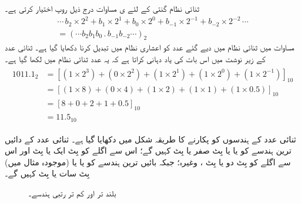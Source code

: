 	 ثنائی نظام گنتی کے لئے ی مساوات  درج ذیل روپ اختیار کرتی ہے۔
\begin{multline}\label{مساوات_ثنائی_عمومی_روپ_ثنائی}
\cdots\, b_2\times 2^2+b_1\times 2^1+b_0\times 2^0+b_{-1}\times 2^{-1}+b_{-2}\times 2^{-2}\,\cdots\\
=(\cdots b_2b_1b_0\, .\, b_{-1}b_{-2}\cdots)_{2}
\end{multline}
	مساوات  میں ثنائی نظام میں دیے گئے عدد کو اعشاری نظام میں تبدیل کرنا دکھایا گیا ہے۔ ثنائی عدد کے زیر نوشت میں  اس بات کی یاد دہانی کراتا ہے کہ یہ عدد ثنائی نظام میں لکھا گیا ہے۔
\begin{gather} 
\begin{aligned}\label{مساوات_ثنائی_مثال}
1011.1_2&=[(1\times 2^3)+(0\times 2^2)+(1\times 2^1)+(1\times 2^0)+(1\times 2^{-1})]_{10}\\
&=[(1\times 8)+(0\times 4)+(1\times 2)+(1\times 1)+(1\times 0.5)]_{10}\\
&=[8+0+2+1+0.5]_{10}\\
&=11.5_{10}
\end{aligned}
\end{gather}
	
 ثنائی عدد کے ہندسوں کو پکارنے کا طریقہ شکل  میں دکھایا گیا ہے۔ ثنائی عدد کے دائیں ترین ہندسے کو   یا    یا بِٹ صفر یا بِٹ  کہیں گے؛ اس سے اگلے کو بِٹ ایک یا بِٹ  اور اس سے اگلے کو بِٹ دو یا بِٹ ، وغیرہ؛ جبکہ بائیں ترین ہندسے کو   یا  یا (موجودہ مثال میں) بِٹ سات یا بِٹ  کہیں گے۔

\begin{figure}
\centering
{}
\caption{بلند تر اور کم تر رتبی ہندسے۔}
\label{شکل_ثنائی_رتبہ_ہندسہ}
\end{figure}

